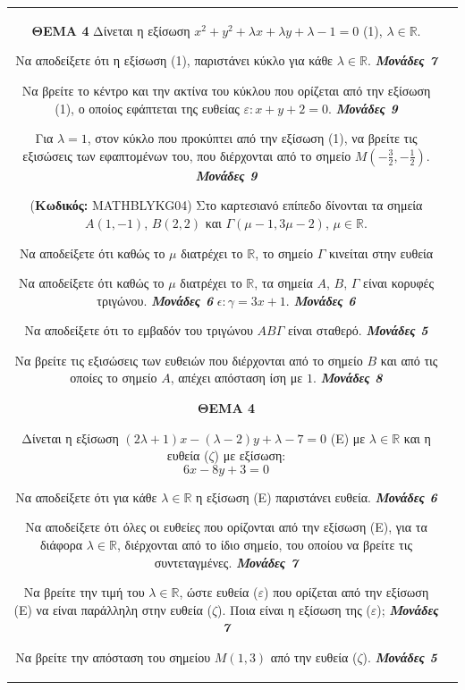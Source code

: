 \documentclass[11pt,a4paper,twoside]{book}
\newcommand{\Askhseis}[1]{{\urwgothic\bfseries\fontsize{16}{19}\selectfont #1}}
\newcounter{askhsh}[chapter]
\renewcommand{\theaskhsh}{
	\bf{\titlefont{\Large{\thechapter}}.\arabic{askhsh}}
}
\newcommand{\Askhsh}[2]{\refstepcounter{askhsh}{\vspace{4mm}\titlefont{{\large Άσκηση}\theaskhsh} - \textcolor{maincolor}{ΘEMA #2}} ({\small{\textbf{Κωδικός:} #1}})}{}
\newcommand{\monades}[1]{
\hspace*{\fill}
\textbf{\textit{\textcolor{maincolor}{Μονάδες #1}}}}
\begin{document}
\begin{tabular}{cc}
\Askhseis{ΘΕΜΑ 4}
Δίνεται η εξίσωση $x^2 + y^2 + \lambda x + \lambda y + \lambda - 1 = 0$ (1), $\lambda \in \mathbb{R}$.
\begin{alist}    \item Να αποδείξετε ότι η εξίσωση (1), παριστάνει κύκλο για κάθε $\lambda \in \mathbb{R}$. \monades{7}
    \item Να βρείτε το κέντρο και την ακτίνα του κύκλου που ορίζεται από την εξίσωση (1), ο οποίος εφάπτεται της ευθείας $\varepsilon: x + y + 2 = 0$. \monades{9}
    \item Για $\lambda = 1$, στον κύκλο που προκύπτει από την εξίσωση (1), να βρείτε τις εξισώσεις των εφαπτομένων του, που διέρχονται από το σημείο $M\left(-\frac{3}{2}, -\frac{1}{2}\right)$. \monades{9}\end{alist}

\vspace{4mm}

\Askhsh{MATHBLYKG04}{4}
Στο καρτεσιανό επίπεδο δίνονται τα σημεία $A(1, -1)$, $B(2, 2)$ και $\Gamma(\mu-1, 3\mu-2)$, $\mu\in\mathbb{R}$.

\begin{alist}    \item Να αποδείξετε ότι καθώς το $\mu$ διατρέχει το $\mathbb{R}$, το σημείο $\Gamma$ κινείται στην ευθεία
    \item Να αποδείξετε ότι καθώς το $\mu$ διατρέχει το $\mathbb{R}$, τα σημεία $A$, $B$, $\Gamma$ είναι κορυφές τριγώνου. \monades{6}  $\epsilon: \gamma = 3x +1$. \monades{6}
    \item Να αποδείξετε ότι το εμβαδόν του τριγώνου $AB\Gamma$ είναι σταθερό. \monades{5}
    \item Να βρείτε τις εξισώσεις των ευθειών που διέρχονται από το σημείο $B$ και από τις οποίες το σημείο $A$, απέχει απόσταση ίση με $1$. \monades{8}\end{alist}

\vspace{4mm}

\textbf{ΘΕΜΑ 4}

Δίνεται η εξίσωση $(2\lambda+1)x - (\lambda - 2)y + \lambda - 7 = 0$ (Ε) με $\lambda\in \mathbb{R}$ και η ευθεία ($\zeta$) με εξίσωση:
\[
6x - 8y + 3 = 0
\]

\begin{alist}    \item Να αποδείξετε ότι για κάθε $\lambda\in \mathbb{R}$ η εξίσωση (Ε) παριστάνει ευθεία. \monades{6}
    \item Να αποδείξετε ότι όλες οι ευθείες που ορίζονται από την εξίσωση (Ε), για τα διάφορα $\lambda\in \mathbb{R}$, διέρχονται από το ίδιο σημείο, του οποίου να βρείτε τις συντεταγμένες. \monades{7}
    \item Να βρείτε την τιμή του $\lambda\in \mathbb{R}$, ώστε ευθεία ($\varepsilon$) που ορίζεται από την εξίσωση (Ε) να είναι παράλληλη στην ευθεία ($\zeta$). Ποια είναι η εξίσωση της ($\varepsilon$); \monades{7}
    \item Να βρείτε την απόσταση του σημείου $M(1,3)$ από την ευθεία ($\zeta$). \monades{5}\end{alist}


\end{tabular}
\end{document}
